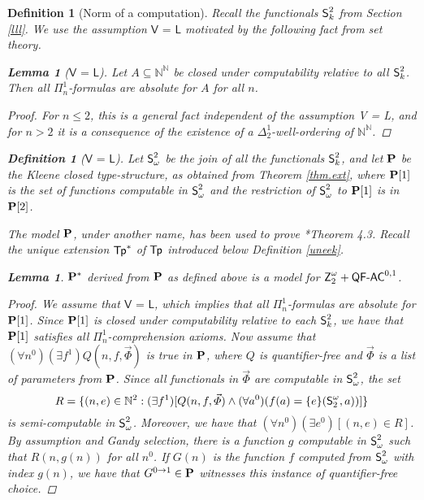 \documentclass[reqno]{amsart}
\newtheorem{defi}[thm]{Definition}
\newtheorem{lemma}[thm]{Lemma}
\newtheorem{definition}[thm]{Definition}
\def\Z{\textup{\textsf{Z}}}
\def\N{{\mathbb  N}}
\def\di{\rightarrow}
\def\QFAC{\textup{\textsf{QF-AC}}}
\def\TP{\textup{\textsf{Tp}}}
\def\SS{\textup{\textsf{S}}}
\numberwithin{equation}{section}
\numberwithin{thm}{section}
\begin{document}
\begin{defi}[Norm of a computation]
Recall the functionals $\SS^{2}_{k}$ from Section \ref{lll}. We use the assumption $\textsf{V = L}$ motivated by the following fact from set theory.
\begin{lemma}[$\textsf{V = L}$] Let $A \subseteq \N^\N$ be closed under computability relative to all $\SS^{2}_{k}$. Then all $\Pi^1_n$-formulas are absolute for $A$ for all $n$. \end{lemma}
\begin{proof} 
For $n \leq 2$, this is a general fact independent of the assumption \textsf{V = L}, and for $n > 2$ it  is a consequence of the existence of a $\Delta^1_2$-well-ordering of $\N^\N$. 
\end{proof}
\begin{definition}[$\textsf{V = L}$]\label{defP}{\em 
Let $\SS^{2}_{\omega}$ be the join of all the functionals $\SS^{2}_{k}$, and let ${\bf P}$ be the Kleene closed  type-structure, as obtained from Theorem \ref{thm.ext}, where ${\bf P}[1]$ is the set of functions computable in $\SS^{2}_{\omega}$ and the restriction of $\SS^{2}_{\omega}$ to ${\bf P}[1]$ is in ${\bf P}[2]$.}
\end{definition}
The model ${\bf P}$, under another name, has been used to prove \cite{dagsamV}*{Theorem 4.3}.
Recall the unique extension $\TP^{*}$ of $\TP$ introduced below Definition \ref{uneek}.
\begin{lemma}\label{lemmaP}
 ${\bf P}^*$ derived  from ${\bf P}$ as defined above is a model for $\Z_{2}^{\omega} + \QFAC^{0,1}$. 
 \end{lemma}
\begin{proof} 
We assume that $\textsf{V = L}$, which implies that all $\Pi^1_n$-formulas are absolute for ${\bf P}[1]$.  Since ${\bf P}[1]$ is closed under computability relative to each $\SS^{2}_k$, we have that ${\bf P}[1]$ satisfies all $\Pi^1_n$-comprehension axioms. Now assume that $(\forall n^{0}) (\exists f^{1}) Q(n,f,\vec \Phi)$  is true in ${\bf P}$, where $Q$ is quantifier-free and $\vec \Phi$ is a list of parameters from ${\bf P}$. 
 Since all functionals in $\vec \Phi$ are computable in $\SS^{2}_\omega$, the set 
 \[
 R=\{(n, e)\in \N^{2} : (\exists f^{1})[ Q(n,f,\vec \Phi)\wedge (\forall a^{0})(f(a) = \{e\}(\SS_2^\omega,a))] \}
 \]
 is semi-computable in $\SS^{2}_{\omega}$. Moreover, we have that  $(\forall n^{0}) (\exists e^{0})[(n,e)  \in R]$.
 By assumption and Gandy selection, there is a function $g$ computable in $\SS^{2}_{\omega}$ such that $R(n,g(n))$ for all $n^{0}$. 
 If $G(n)$ is the function $f$ computed from $\SS^{2}_{\omega}$ with index $g(n)$, we have that $G^{0\di 1} \in \bf P$ witnesses this instance of quantifier-free choice.

\end{proof}
\end{defi}
\end{document}
